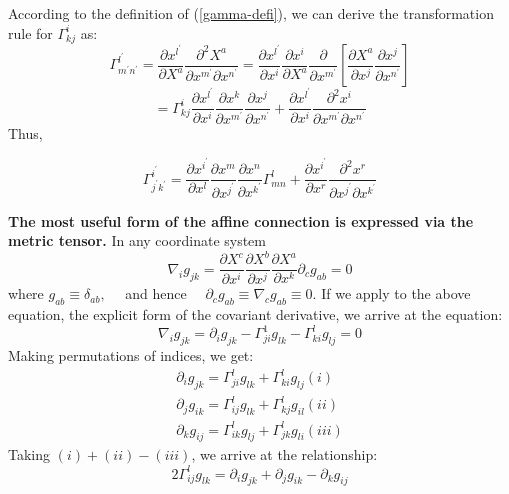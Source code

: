 According to the definition of  (\ref{gamma-defi}), we can derive the transformation rule for $\Gamma^i_{kj}$ as:
$$
\Gamma_{m^{\prime} n^{\prime}}^{l^{\prime}}=\frac{\partial x^{l^{\prime}}}{\partial X^{a}} \frac{\partial^{2} X^{a}}{\partial x^{m^{\prime}} \partial x^{n^{\prime}}}=\frac{\partial x^{l^{\prime}}}{\partial x^{i}} \frac{\partial x^{i}}{\partial X^{a}} \frac{\partial}{\partial x^{m^{\prime}}}\left[\frac{\partial X^{a}}{\partial x^{j}} \frac{\partial x^{j}}{\partial x^{n^{\prime}}}\right]
$$
$$
=\Gamma_{k j}^{i} \frac{\partial x^{l^{\prime}}}{\partial x^{i}} \frac{\partial x^{k}}{\partial x^{m^{\prime}}} \frac{\partial x^{j}}{\partial x^{n^{\prime}}}+\frac{\partial x^{l^{\prime}}}{\partial x^{i}} \frac{\partial^{2} x^{i}}{\partial x^{m^{\prime}} \partial x^{n^{\prime}}}
$$
Thus,
\begin{qt}
\begin{equation}
\Gamma_{j^{\prime} k^{\prime}}^{i^{\prime}}=\frac{\partial x^{i^{\prime}}}{\partial x^{l}} \frac{\partial x^{m}}{\partial x^{j^{\prime}}} \frac{\partial x^{n}}{\partial x^{k^{\prime}}} \Gamma_{m n}^{l}+\frac{\partial x^{i^{\prime}}}{\partial x^{r}} \frac{\partial^{2} x^{r}}{\partial x^{j^{\prime}} \partial x^{k^{\prime}}}
\end{equation}
\end{qt}
\textbf{The most useful form of the affine connection is expressed via the metric tensor.} In any coordinate system
\begin{equation}
\nabla_{i} g_{j k}=\frac{\partial X^{c}}{\partial x^{i}} \frac{\partial X^{b}}{\partial x^{j}} \frac{\partial X^{a}}{\partial x^{k}} \partial_{c} g_{a b}=0
\end{equation}
where $g_{a b} \equiv \delta_{a b}, \quad$ and hence $\quad \partial_{c} g_{a b} \equiv \nabla_{c} g_{a b} \equiv 0$. If we apply to the above equation, the explicit form of the covariant derivative, we arrive at the equation:
$$
\nabla_{i} g_{j k}=\partial_{i} g_{j k}-\Gamma_{j i}^{1} g_{l k}-\Gamma_{k i}^{l} g_{l j}=0
$$
Making permutations of indices, we get:
$$
\begin{array}{l}
{\partial_{i} g_{j k}=\Gamma_{j i}^{l} g_{l k}+\Gamma_{k i}^{l} g_{l j}} (i)\\
{\partial_{j} g_{i k}=\Gamma_{i j}^{l} g_{l k}+\Gamma_{k j}^{l} g_{i l}} (ii)\\
{\partial_{k} g_{i j}=\Gamma_{i k}^{l} g_{l j}+\Gamma_{j k}^{l} g_{l i}}(iii)
\end{array}
$$
Taking $(i)+(ii)-(iii)$, we arrive at the relationship:
$$
2 \Gamma_{i j}^{l} g_{l k}=\partial_{i} g_{j k}+\partial_{j} g_{i k}-\partial_{k} g_{i j}
$$
